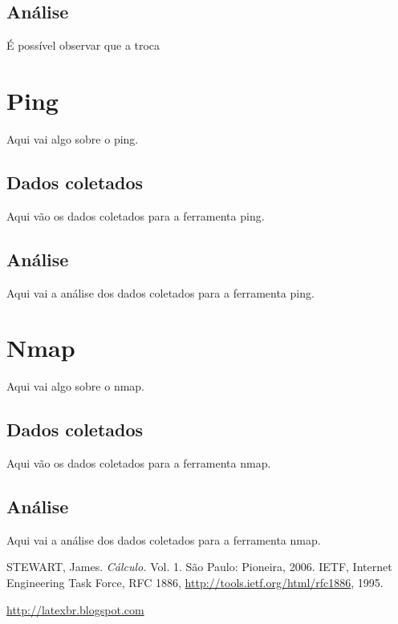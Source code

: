 \documentclass[a4paper]{report} %
\begin{document}
\subsection{Análise}
\label{sub_traceroute_analise}
É possível observar que a troca 

\section{Ping}
\label{sec_ping}
Aqui vai algo sobre o ping.
\subsection{Dados coletados}
\label{sub_ping_dados}
Aqui vão os dados coletados para a ferramenta ping.

\subsection{Análise}
\label{sub_ping_analise}
Aqui vai a análise dos dados coletados para a ferramenta ping.

\section{Nmap}
\label{sec_nmap}
Aqui vai algo sobre o nmap.
\subsection{Dados coletados}
\label{sub_nmap_dados}
Aqui vão os dados coletados para a ferramenta nmap.

\subsection{Análise}
\label{sub_nmap_analise}
Aqui vai a análise dos dados coletados para a ferramenta nmap.

\begin{thebibliography}{99}
 STEWART, James. {\sl C\'alculo.} Vol. 1. S\~ao Paulo: Pioneira, 2006.
 IETF, Internet Engineering Task Force, RFC 1886, \url{http://tools.ietf.org/html/rfc1886}, 1995.

\url{http://latexbr.blogspot.com}
\end{thebibliography}

\end{document}
